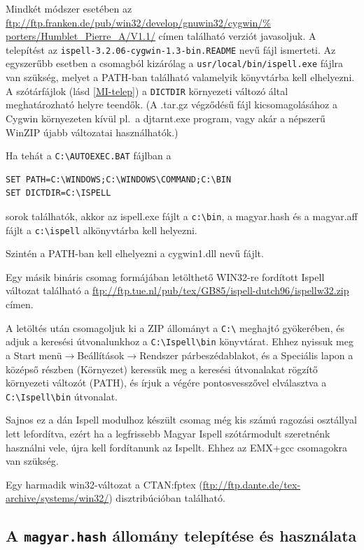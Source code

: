 Mindkét módszer esetében az
\url{ftp://ftp.franken.de/pub/win32/develop/gnuwin32/cygwin/%
porters/Humblet_Pierre_A/V1.1/} címen található verziót javasoljuk. A
telepítést az \texttt{ispell-3.2.06-cygwin-1.3-bin.README} nevű fájl
ismerteti. Az egyszerűbb esetben a csomagból kizárólag a
\texttt{usr/local/bin/ispell.exe} fájlra van szükség, melyet a
PATH-ban található valamelyik könyvtárba kell elhelyezni.  A
szótárfájlok (lásd \ref{MI-telep}) a \texttt{DICTDIR} környezeti
változó által meghatározható helyre teendők.  (A .tar.gz végződésű
fájl kicsomagolásához a Cygwin környezeten kívül pl.\ a djtarnt.exe
program, vagy akár a népszerű WinZIP újabb változatai használhatók.)

Ha tehát a \verb+C:\AUTOEXEC.BAT+ fájlban a
\begin{verbatim}
SET PATH=C:\WINDOWS;C:\WINDOWS\COMMAND;C:\BIN
SET DICTDIR=C:\ISPELL
\end{verbatim}
\noindent sorok találhatók, akkor az ispell.exe fájlt a \verb+c:\bin+, 
a magyar.hash és a magyar.aff fájlt a \verb+c:\ispell+ alkönyvtárba
kell helyezni.

Szintén a PATH-ban kell elhelyezni a cygwin1.dll nevű fájlt.

Egy másik bináris csomag formájában letölthető WIN32-re fordított
Ispell változat található a
\url{ftp://ftp.tue.nl/pub/tex/GB85/ispell-dutch96/ispellw32.zip}
címen.

A letöltés után csomagoljuk ki a ZIP állományt a
\verb|C:\| meghajtó gyökerében, és adjuk a
keresési útvonalunkhoz a \verb|C:\Ispell\bin|
könyvtárat. Ehhez nyissuk meg a 
Start menü$\rightarrow$Beállítások$\rightarrow$Rendszer
párbeszédablakot, és a Speciális lapon
a középső részben (Környezet)
keressük meg a keresési útvonalakat rögzítő környezeti
változót (PATH), és írjuk a végére
pontosvesszővel elválasztva a
\verb|C:\Ispell\bin| útvonalat.

Sajnos ez a dán Ispell modulhoz készült csomag
még kis számú ragozási osztállyal
lett lefordítva, ezért ha a legfrissebb
Magyar Ispell szótármodult szeretnénk használni vele,
újra kell fordítanunk az Ispellt. Ehhez
az EMX+gcc csomagokra van szükség.

Egy harmadik win32-változat a CTAN:fptex
(\url{ftp://ftp.dante.de/tex-archive/systems/win32/}) disztribúcióban
található.

\subsection{A \texttt{magyar.hash} állomány telepítése és használata}

